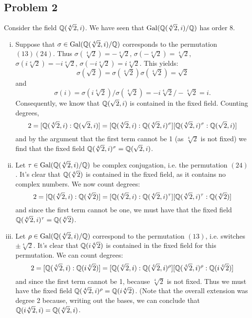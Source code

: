 \documentclass{../../mathnotes}
\begin{document}
\subsection*{Problem 2}

Consider the field $\mathbb{Q}(\sqrt[4]{2},i)$. We have seen that $\operatorname{Gal}(\mathbb{Q}(\sqrt[4]{2},i)/\mathbb{Q})$ has order 8.

\begin{enumerate}[(i)]
    \item Suppose that $\sigma\in\operatorname{Gal}(\mathbb{Q}(\sqrt[4]{2},i)/\mathbb{Q})$ corresponds to the permutation $(13)(24)$.
        Thus $\sigma(\sqrt[4]{2})=-\sqrt[4]{2}$, $\sigma(-\sqrt[4]{2})=\sqrt[4]{2}$, $\sigma(i\sqrt[4]{2})=-i\sqrt[4]{2}$,
        $\sigma(-i\sqrt[4]{2})=i\sqrt[4]{2}$. This yields:
        \[\sigma(\sqrt{2})=\sigma(\sqrt[4]{2})\sigma(\sqrt[4]{2})=\sqrt{2}\]
        and
        \[\sigma(i)=\sigma(i\sqrt[4]{2})/\sigma(\sqrt[4]{2})=-i\sqrt[4]{2}/-\sqrt[4]{2}=i.\]
        Consequently, we know that $\mathbb{Q}(\sqrt{2},i)$ is contained in the fixed field. Counting degrees,
        \[ 2=[\mathbb{Q}(\sqrt[4]{2},i):\mathbb{Q}(\sqrt{2},i)]=[\mathbb{Q}(\sqrt[4]{2},i):\mathbb{Q}(\sqrt[4]{2},i)^\sigma][\mathbb{Q}(\sqrt[4]{2},i)^\sigma:\mathbb{Q}(\sqrt{2},i)]  \]
        and by the argument that the first term cannot be 1 (as $\sqrt[4]{2}$ is not fixed) we find that the fixed
        field $\mathbb{Q}(\sqrt[4]{2},i)^\sigma=\mathbb{Q}(\sqrt{2},i)$.
    \item Let $\tau\in\operatorname{Gal}(\mathbb{Q}(\sqrt[4]{2},i)/\mathbb{Q})$ be complex conjugation, i.e. the permutation $(24)$. It's
        clear that $\mathbb{Q}(\sqrt[4]{2})$ is contained in the fixed field, as it contains no complex numbers. We
        now count degrees:
        \[ 2=[\mathbb{Q}(\sqrt[4]{2},i):\mathbb{Q}(\sqrt[4]{2})]=[\mathbb{Q}(\sqrt[4]{2},i):\mathbb{Q}(\sqrt[4]{2},i)^\tau][\mathbb{Q}(\sqrt[4]{2},i)^\tau:\mathbb{Q}(\sqrt[4]{2})]  \]
        and since the first term cannot be one, we must have that the fixed field
        $\mathbb{Q}(\sqrt[4]{2},i)^\tau=\mathbb{Q}(\sqrt[4]{2})$.
    \item Let $\rho\in\operatorname{Gal}(\mathbb{Q}(\sqrt[4]{2},i)/\mathbb{Q})$ correspond to the permutation $(13)$, i.e. switches
        $\pm\sqrt[4]{2}$. It's clear that $\mathbb{Q}(i\sqrt[4]{2})$ is contained in the fixed field for this permutation.
        We can count degrees:
        \[ 2=[\mathbb{Q}(\sqrt[4]{2},i):\mathbb{Q}(i\sqrt[4]{2})]=[\mathbb{Q}(\sqrt[4]{2},i):\mathbb{Q}(\sqrt[4]{2},i)^\rho][\mathbb{Q}(\sqrt[4]{2},i)^\rho:\mathbb{Q}(i\sqrt[4]{2})]  \]
        and since the first term cannot be 1, because $\sqrt[4]{2}$ is not fixed. Thus we must have
        the fixed field $\mathbb{Q}(\sqrt[4]{2},i)^\rho=\mathbb{Q}(i\sqrt[4]{2})$. (Note that the overall extension was degree 2 because, writing out the bases,
        we can conclude that $\mathbb{Q}(i\sqrt[4]{2},i)=\mathbb{Q}(\sqrt[4]{2},i)$.

\end{enumerate}
\end{document}
